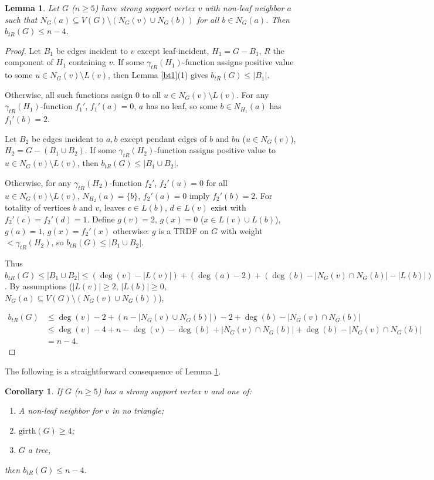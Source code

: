\documentclass[12pt,reqno]{amsart}
\theoremstyle{plain}
\newtheorem{corollary}[theorem]{Corollary}
\newtheorem{lemma}[theorem]{Lemma}
\numberwithin{equation}{section}
\begin{document}
\begin{lemma}\label{Prop20}
Let $G$ ($n \geq 5$) have strong support vertex $v$ with non-leaf neighbor $a$ such that $N_G(a) \subseteq V(G) \setminus (N_G(v) \cup N_G(b))$ for all $b \in N_G(a)$. Then $b_{tR}(G) \leq n - 4$.
\end{lemma}
\begin{proof}
Let $B_1$ be edges incident to $v$ except leaf-incident, $H_1 = G - B_1$, $R$ the component of $H_1$ containing $v$. If some $\gamma_{tR}(H_1)$-function assigns positive value to some $u \in N_G(v) \setminus L(v)$, then Lemma \ref{bt1}(1) gives $b_{tR}(G) \leq |B_1|$.

Otherwise, all such functions assign $0$ to all $u \in N_G(v) \setminus L(v)$. For any $\gamma_{tR}(H_1)$-function $f_1'$, $f_1'(a) = 0$, $a$ has no leaf, so some $b \in N_{H_1}(a)$ has $f_1'(b) = 2$.

Let $B_2$ be edges incident to $a,b$ except pendant edges of $b$ and $bu$ ($u \in N_G(v)$), $H_2 = G - (B_1 \cup B_2)$. If some $\gamma_{tR}(H_2)$-function assigns positive value to $u \in N_G(v) \setminus L(v)$, then $b_{tR}(G) \leq |B_1 \cup B_2|$.

Otherwise, for any $\gamma_{tR}(H_2)$-function $f_2'$, $f_2'(u) = 0$ for all $u \in N_G(v) \setminus L(v)$, $N_{H_2}(a) = \{b\}$, $f_2'(a) = 0$ imply $f_2'(b) = 2$. For totality of vertices $b$ and $v$, leaves $c \in L(b)$, $d \in L(v)$ exist with $f_2'(c) = f_2'(d) = 1$. Define $g(v) = 2$, $g(x) = 0$ ($x \in L(v) \cup L(b)$), $g(a) = 1$, $g(x) = f_2'(x)$ otherwise: $g$ is a TRDF on $G$ with weight $< \gamma_{tR}(H_2)$, so $b_{tR}(G) \leq |B_1 \cup B_2|$. 

Thus $b_{tR}(G) \leq |B_1 \cup B_2| \leq (\deg(v) - |L(v)|) + (\deg(a) - 2) + (\deg(b) - |N_G(v) \cap N_G(b)| - |L(b)|)$. By assumptions ($|L(v)| \geq 2$, $|L(b)| \geq 0$, $N_G(a) \subseteq V(G) \setminus (N_G(v) \cup N_G(b))$),

\begin{align*}
b_{tR}(G) &\leq \deg(v)-2+ (n-|N_G(v)\cup N_G(b)|)-2+\deg(b)-|N_G(v) \cap N_G(b)| \\
&\leq \deg(v)-4+ n-\deg(v)-\deg(b)+|N_G(v) \cap N_G(b)|+\deg(b)-|N_G(v) \cap N_G(b)|\\
& =n-4.
\end{align*}
\end{proof}

The following is a straightforward consequence of Lemma \ref{Prop20}.
\begin{corollary}
If $G$ ($n \geq 5$) has a strong support vertex $v$ and one of:
\begin{enumerate}
\item A non-leaf neighbor for $v$ in no triangle;
\item $\mathrm{girth}(G) \geq 4$;
\item $G$ a tree,
\end{enumerate}
then $b_{tR}(G) \leq n - 4$.
\end{corollary}
\end{document}
